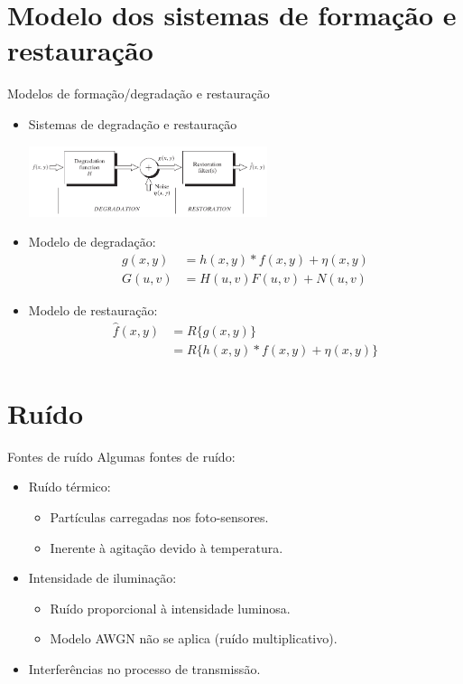 \section[slide=true]{Modelo dos sistemas de formação e restauração}
\begin{slide}[toc=]{Modelos de formação/degradação e restauração}
	\begin{itemize}
		\item Sistemas de degradação e restauração
			\begin{center}
				\includegraphics[width=0.55\textwidth]{figs/5-01}
			\end{center}
		\item Modelo de degradação:
			\begin{align*}
				g(x,y) &= h(x,y)\ast f(x,y) + \eta(x,y)\\
				G(u,v) &= H(u,v) F(u,v) + N(u,v)
			\end{align*}
		\item Modelo de restauração:
			\begin{align*}
				\hat f(x,y) &= R\{g(x,y)\}\\
					    &= R\{h(x,y)\ast f(x,y) + \eta(x,y)\}
			\end{align*}
	\end{itemize}
\end{slide}
   
\section[slide=true]{Ruído}
\begin{slide}[toc=]{Fontes de ruído}
	Algumas fontes de ruído:
	\begin{itemize}[type=1]
		\item Ruído térmico: 
			\begin{itemize}
				\item Partículas carregadas nos foto-sensores.
				\item Inerente à agitação devido à temperatura.
			\end{itemize}
		\item Intensidade de iluminação: 
			\begin{itemize}
				\item Ruído proporcional à intensidade luminosa.
				\item Modelo AWGN não se aplica (ruído multiplicativo).
			\end{itemize}
		\item Interferências no processo de transmissão.
	\end{itemize}
\end{slide}
     
